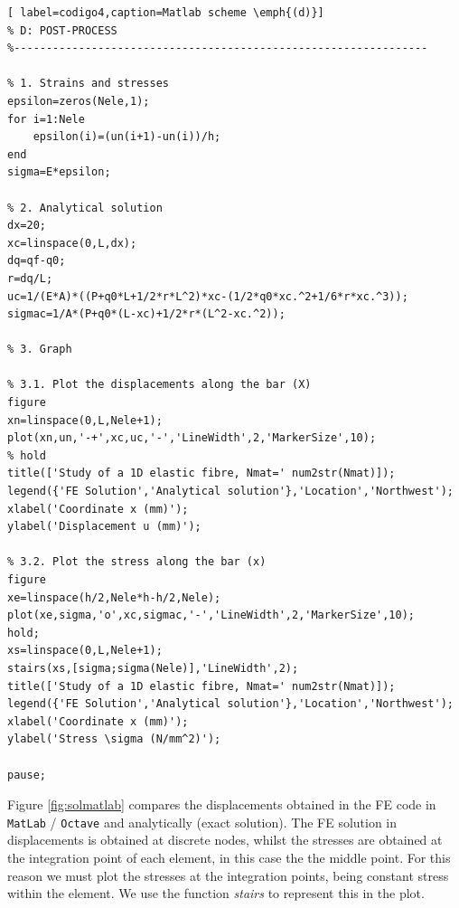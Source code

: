 \documentclass[spanish,a4paper,12pt]{article}
\begin{document}
\begin{itemize}
\begin{lstlisting}[ label=codigo4,caption=Matlab scheme \emph{(d)}]
% D: POST-PROCESS
%----------------------------------------------------------------

% 1. Strains and stresses
epsilon=zeros(Nele,1);
for i=1:Nele
    epsilon(i)=(un(i+1)-un(i))/h;
end
sigma=E*epsilon;

% 2. Analytical solution
dx=20;
xc=linspace(0,L,dx);
dq=qf-q0;
r=dq/L;
uc=1/(E*A)*((P+q0*L+1/2*r*L^2)*xc-(1/2*q0*xc.^2+1/6*r*xc.^3));
sigmac=1/A*(P+q0*(L-xc)+1/2*r*(L^2-xc.^2));

% 3. Graph

% 3.1. Plot the displacements along the bar (X)
figure 
xn=linspace(0,L,Nele+1);
plot(xn,un,'-+',xc,uc,'-','LineWidth',2,'MarkerSize',10);
% hold
title(['Study of a 1D elastic fibre, Nmat=' num2str(Nmat)]);
legend({'FE Solution','Analytical solution'},'Location','Northwest');
xlabel('Coordinate x (mm)');
ylabel('Displacement u (mm)');

% 3.2. Plot the stress along the bar (x)
figure
xe=linspace(h/2,Nele*h-h/2,Nele); 
plot(xe,sigma,'o',xc,sigmac,'-','LineWidth',2,'MarkerSize',10);
hold;
xs=linspace(0,L,Nele+1);
stairs(xs,[sigma;sigma(Nele)],'LineWidth',2);
title(['Study of a 1D elastic fibre, Nmat=' num2str(Nmat)]);
legend({'FE Solution','Analytical solution'},'Location','Northwest');
xlabel('Coordinate x (mm)');
ylabel('Stress \sigma (N/mm^2)');

pause;

\end{lstlisting}

Figure \ref{fig:solmatlab} compares the displacements obtained in the FE code in \texttt{MatLab} / \texttt{Octave} and analytically (exact solution). The FE solution in displacements is obtained at discrete nodes, whilst the stresses are obtained at the integration point of each element, in this case the the middle point. For this reason we must plot the stresses at the integration points, being constant stress within the element. We use the function \emph{stairs} to represent this in the plot.


\end{itemize}
\end{document}
